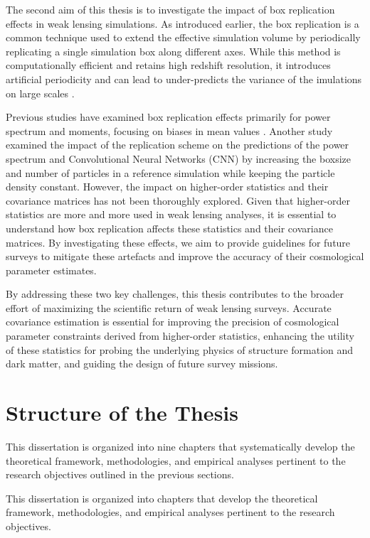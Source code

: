 The second aim of this thesis is to investigate the impact of box replication effects in weak lensing simulations. As introduced earlier, the box replication is a common technique used to extend the effective simulation volume by periodically replicating a single simulation box along different axes. While this method is computationally efficient and retains high redshift resolution, it introduces artificial periodicity and can lead to under-predicts the variance of the imulations on large scales \citep{2021JCAP...01..028Z}.

Previous studies have examined box replication effects primarily for power spectrum and moments, focusing on biases in mean values \citep{2024MNRAS.534.1205C}. Another study \citep{2019PhRvD.100f3514F} examined the impact of the replication scheme on the predictions of the power spectrum and Convolutional Neural Networks (CNN) by increasing the boxsize and number of particles in a reference simulation while keeping the particle density constant. 
However, the impact on higher-order statistics and their covariance matrices has not been thoroughly explored. Given that higher-order statistics are more and more used in weak lensing analyses, it is essential to understand how box replication affects these statistics and their covariance matrices. By investigating these effects, we aim to provide guidelines for future surveys to mitigate these artefacts and improve the accuracy of their cosmological parameter estimates.

By addressing these two key challenges, this thesis contributes to the broader effort of maximizing the scientific return of weak lensing surveys. Accurate covariance estimation is essential for improving the precision of cosmological parameter constraints derived from higher-order statistics, enhancing the utility of these statistics for probing the underlying physics of structure formation and dark matter, and guiding the design of future survey missions.

\section{Structure of the Thesis}
This dissertation is organized into nine chapters that systematically develop the theoretical framework, methodologies, and empirical analyses pertinent to the research objectives outlined in the previous sections.

This dissertation is organized into chapters that develop the theoretical framework, methodologies, and empirical analyses pertinent to the research objectives. 

